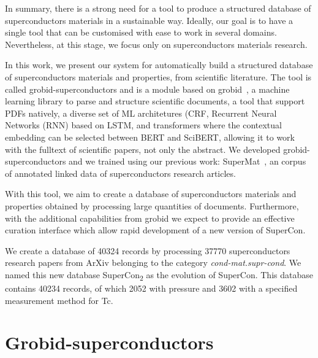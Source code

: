 \documentclass{article}
\begin{document}
In summary, there is a strong need for a tool to produce a structured database of superconductors materials in a sustainable way. 
Ideally, our goal is to have a single tool that can be customised with ease to work in several domains. Nevertheless, at this stage, we focus only on superconductors materials research. 

In this work, we present our system for automatically build a structured database of superconductors materials and properties, from scientific literature. The tool is called grobid-superconductors and is a module based on grobid~\cite{GROBID}, a machine learning library to parse and structure scientific documents, a tool that support PDFs natively, a diverse set of ML architetures (CRF, Recurrent Neural Networks (RNN) based on LSTM, and transformers where the contextual embedding can be selected between BERT and SciBERT, allowing it to work with the fulltext of scientific papers, not only the abstract.
We developed grobid-superconductors and we trained using our previous work: SuperMat~\cite{foppiano2021supermat}, an corpus of annotated linked data of superconductors research articles.


With this tool, we aim to create a database of superconductors materials and properties obtained by processing large quantities of documents. Furthermore, with the additional capabilities from grobid we expect to provide an effective curation interface which allow rapid development of a new version of SuperCon. 


We create a database of 40324 records by processing 37770 superconductors research papers from ArXiv belonging to the category \textit{cond-mat.supr-cond}. 
We named this new database  SuperCon\textsubscript{2} as the evolution of SuperCon. 
This database contains 40234 records, of which 2052 with pressure and 3602 with a specified measurement method for Tc.



\section{Grobid-superconductors}
\end{document}
